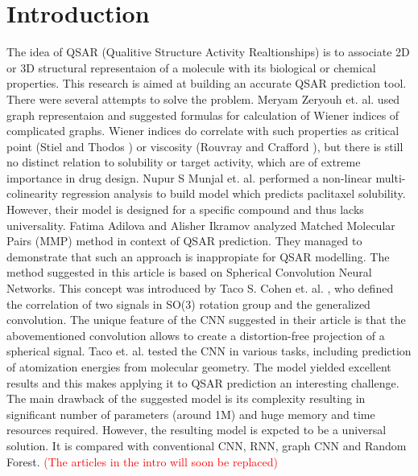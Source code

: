 \documentclass[12pt,twoside]{article}
\begin{document}
\section{Introduction}
    The idea of QSAR (Qualitive Structure Activity Realtionships) is to associate 2D or 3D structural representaion of a molecule with its biological or chemical properties. 
    This research is aimed at building an accurate QSAR prediction tool. There were several attempts to solve the problem. Meryam Zeryouh et. al. \cite{Wiener15} used graph representaion and suggested formulas for calculation of Wiener indices of complicated graphs. 
    Wiener indices do correlate with such properties as critical point (Stiel and Thodos \cite{Critical}) or viscosity (Rouvray and Crafford \cite{Visc}), but there is still no distinct relation to solubility or target activity, which are of extreme importance in drug design. 
    Nupur S Munjal et. al. \cite{Paclitaxel16} performed a non-linear multi-colinearity regression analysis to build model which predicts paclitaxel solubility. However, their model is designed for a specific compound and thus lacks universality. 
    Fatima Adilova and Alisher Ikramov \cite{MMP17} analyzed Matched Molecular Pairs (MMP) method in context of QSAR prediction. They managed to demonstrate that such an approach is inappropiate for QSAR modelling. 
\newline
    The method suggested in this article is based on Spherical Convolution Neural Networks. This concept was introduced by Taco S. Cohen et. al. \cite{SCNN}, who defined the correlation of two signals in SO(3) rotation group and the generalized convolution. 
    The unique feature of the CNN suggested in their article is that the abovementioned convolution allows to create a distortion-free projection of a spherical signal.
     Taco et. al. tested the CNN in various tasks, including prediction of atomization energies from molecular geometry. The model yielded excellent results and this makes applying it to QSAR prediction an interesting challenge. 
\newline
    The main drawback of the suggested model is its complexity resulting in significant number of parameters (around 1M) and huge memory and time resources required. 
    However, the resulting model is expcted to be a universal solution. It is compared with conventional CNN, RNN, graph CNN and Random Forest. \textcolor{red}{(The articles in the intro will soon be replaced)}
\end{document}

